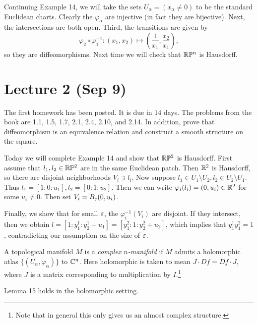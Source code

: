 \documentclass[twoside, 10pt]{article}
\begin{document}
    Continuing Example 14, we will take the sets $U_{\alpha} = (x_{\alpha}\neq
    0)$ to be the standard Euclidean charts. Clearly the $\varphi_{\alpha}$ are
    injective (in fact they are bijective). Next, the intersections are both
    open. Third, the transitions are given by \[\varphi_2 \circ \varphi_1^{-1}:
    (x_1,x_2) \mapsto \left( \frac{1}{x_1}, \frac{x_2}{x_1} \right),\]so they
    are diffeomorphisms. Next time we will check that $\mathbb{R}\mathbb{P}^n$ is Hausdorff.

    \section{Lecture 2 (Sep 9)}%

    The first homework has been posted. It is due in $14$ days. The problems
    from the book are 1.1, 1.5, 1.7, 2.1, 2.4, 2.10, and 2.14. In addition,
    prove that diffeomorphism is an equivalence relation and construct a smooth
    structure on the square.
    
    Today we will complete Example 14 and show that $\mathbb{R}\mathbb{P}^2$ is Hausdorff.
    First assume that $l_1, l_2 \in \mathbb{R}\mathbb{P}^2$ are in the same Euclidean patch.
    Then $\mathbb{R}^2$ is Hausdorff, so there are disjoint neighborhoods $V_i \ni
    l_i$. Now suppose $l_1 \in U_1 \setminus U_2, l_2 \in U_2 \setminus U_1$.
    Thus $l_1 = [1:0:u_1], l_2 = [0:1:u_2]$. Then we can write $\varphi_i(l_i)
    = (0, u_i) \in \mathbb{R}^2$ for some $u_i \neq 0$. Then set $V_i = B_{\varepsilon}(0,
    u_i)$. 
           
    Finally, we show that for small $\varepsilon$, the $\varphi_i^{-1}(V_i)$ are
    disjoint. If they intersect, then we obtain $l = [1:y^1_1:y_2^1 + u_1] =
    [y_1^2:1:y_2^2+u_2]$, which implies that $y_1^1y_1^2 = 1$, contradicting
    our assumption on the size of $\varepsilon$.

    \begin{defn} A topological manifold $M$ is a \textit{complex $n$-manifold}
        if $M$ admits a holomorphic atlas $\{(U_{\alpha}, \varphi_{\alpha})\}$
        to $\mathbb{C}^n$. Here holomorphic is taken to mean $J \cdot Df = Df \cdot J$,
        where $J$ is a matrix corresponding to multiplication by
        $I$.\footnote{Note that in general this only gives us an almost complex
        structure.} \end{defn}

    \begin{thm} Lemma 15 holds in the holomorphic setting.  \end{thm}
\end{document}
